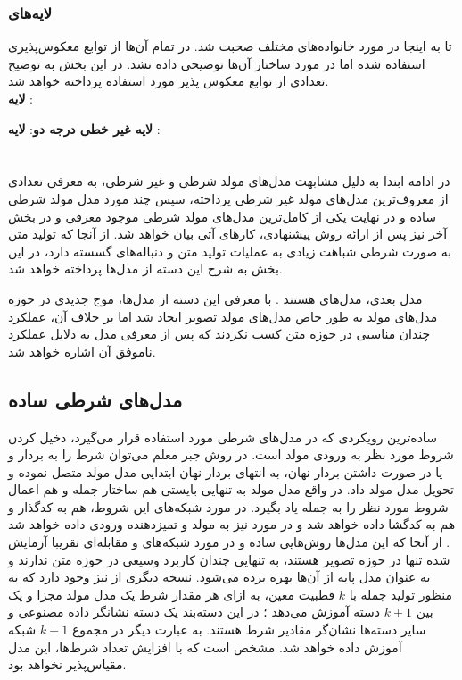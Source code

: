 \subsubsection{لایه‌های \coupling{}}
تا به اینجا در مورد خانواده‌های مختلف \normalizingflownets{} صحبت شد. در تمام آن‌ها از توابع معکوس‌پذیری استفاده شده اما در مورد ساختار آن‌ها توضیحی داده نشد. در این بخش به توضیح تعدادی از توابع معکوس پذیر مورد استفاده پرداخته خواهد شد.
\\
\textbf{لایه 
    \coupling{} }:

\textbf{لایه \coupling{}
    غیر خطی درجه دو}:
\textbf{لایه \coupling{}
   }:
\section{\condtg}
در ادامه ابتدا به دلیل مشابهت مدل‌های مولد شرطی و غیر شرطی، به معرفی تعدادی از معروف‌ترین مدل‌های مولد غیر شرطی پرداخته، سپس چند مورد مدل مولد شرطی ساده و در نهایت یکی از کامل‌ترین مدل‌های مولد شرطی موجود معرفی و در بخش آخر نیز پس از ارائه روش پیشنهادی، کارهای آتی بیان خواهد شد.
از آنجا که تولید متن به صورت شرطی شباهت زیادی به عملیات تولید متن و دنباله‌های گسسته دارد، در این بخش به شرح این دسته از مدل‌ها پرداخته خواهد شد.

مدل بعدی، مدل‌های
هستند \cite{vae-org}. با معرفی این دسته از مدل‌ها، موج جدیدی در حوزه مدل‌های مولد به طور خاص مدل‌های مولد تصویر ایجاد شد اما بر خلاف آن، عملکرد چندان مناسبی در حوزه متن کسب نکردند \cite{vae-text} که پس از معرفی مدل به دلایل عملکرد ناموفق آن اشاره خواهد شد.\\
\subsection{مدل‌های شرطی ساده}
ساده‌ترین رویکردی که در مدل‌های شرطی مورد استفاده قرار می‌گیرد، دخیل کردن شروط مورد نظر به ورودی مولد است. در روش جبر معلم می‌توان شرط را به بردار  و  یا در صورت داشتن بردار نهان، به انتهای بردار نهان ابتدایی مدل مولد متصل نموده و تحویل مدل مولد داد. در واقع مدل مولد به تنهایی بایستی هم ساختار جمله و هم اعمال شروط مورد نظر را به جمله یاد بگیرد. در مورد شبکه‌های \vae{} این شروط، هم به کدگذار و هم به کدگشا داده خواهد شد \cite{cvae} و در مورد\gan{} نیز به مولد و تمیزدهنده ورودی داده خواهد شد \cite{cgan}. از آنجا که این مدل‌ها روش‌هایی ساده و در مورد شبکه‌های \vae{} و مقابله‌ای تقریبا آزمایش شده تنها در حوزه تصویر هستند، به تنهایی چندان کاربرد وسیعی در حوزه متن ندارند و به عنوان مدل پایه از آن‌ها بهره برده ‌می‌شود. نسخه دیگری از \gan{} نیز وجود دارد که به منظور تولید جمله با $k$ قطبیت معین، به ازای هر مقدار شرط یک مدل مولد مجزا و یک  بین $k+1$ دسته آموزش می‌دهد \cite{sentigan}؛ در این دسته‌بند یک دسته نشانگر داده مصنوعی و سایر دسته‌ها نشان‌گر مقادیر شرط هستند. به عبارت دیگر در مجموع $k+1$ شبکه آموزش داده خواهد شد. مشخص است که با افزایش تعداد شرط‌ها، این مدل مقیاس‌پذیر نخواهد بود.

